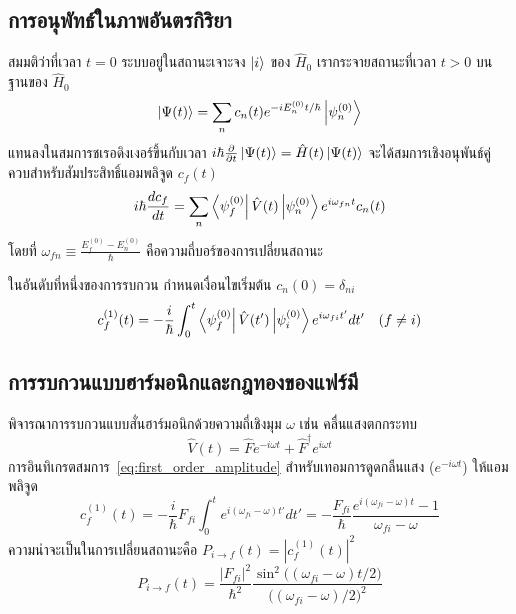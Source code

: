 \subsection{การอนุพัทธ์ในภาพอันตรกิริยา}
สมมติว่าที่เวลา $t = 0$ ระบบอยู่ในสถานะเจาะจง $\ket{i}$ ของ $\hat{H}_0$ เรากระจายสถานะที่เวลา $t > 0$ บนฐานของ $\hat{H}_0$
\begin{equation}
\ket{\Psi(t)} = \sum_n c_n(t) e^{-i E_n^{(0)} t/\hbar} \ket{\psi_n^{(0)}}
\end{equation}
แทนลงในสมการชเรอดิงเงอร์ขึ้นกับเวลา $i\hbar \frac{\partial}{\partial t}\ket{\Psi(t)} = \hat{H}(t)\ket{\Psi(t)}$ จะได้สมการเชิงอนุพันธ์คู่ควบสำหรับสัมประสิทธิ์แอมพลิจูด $c_f(t)$
\begin{equation}
i\hbar \frac{dc_f}{dt} = \sum_n \bra{\psi_f^{(0)}} \hat{V}(t) \ket{\psi_n^{(0)}} e^{i\omega_{fn} t} c_n(t)
\end{equation}
โดยที่ $\omega_{fn} \equiv \frac{E_f^{(0)} - E_n^{(0)}}{\hbar}$ คือความถี่บอร์ของการเปลี่ยนสถานะ

ในอันดับที่หนึ่งของการรบกวน กำหนดเงื่อนไขเริ่มต้น $c_n(0) = \delta_{ni}$
\begin{equation}
c_f^{(1)}(t) = -\frac{i}{\hbar} \int_0^t \bra{\psi_f^{(0)}} \hat{V}(t') \ket{\psi_i^{(0)}} e^{i\omega_{fi} t'} dt' \quad (f \neq i)
\label{eq:first_order_amplitude}
\end{equation}

\subsection{การรบกวนแบบฮาร์มอนิกและกฎทองของแฟร์มี}
พิจารณาการรบกวนแบบสั่นฮาร์มอนิกด้วยความถี่เชิงมุม $\omega$ เช่น คลื่นแสงตกกระทบ
\begin{equation}
\hat{V}(t) = \hat{F} e^{-i\omega t} + \hat{F}^\dagger e^{i\omega t}
\end{equation}
การอินทิเกรตสมการ~\eqref{eq:first_order_amplitude} สำหรับเทอมการดูดกลืนแสง ($e^{-i\omega t}$) ให้แอมพลิจูด
\begin{equation}
c_f^{(1)}(t) = -\frac{i}{\hbar} F_{fi} \int_0^t e^{i(\omega_{fi} - \omega)t'} dt' = -\frac{F_{fi}}{\hbar} \frac{e^{i(\omega_{fi} - \omega)t} - 1}{\omega_{fi} - \omega}
\end{equation}
ความน่าจะเป็นในการเปลี่ยนสถานะคือ $P_{i \to f}(t) = |c_f^{(1)}(t)|^2$
\begin{equation}
P_{i \to f}(t) = \frac{|F_{fi}|^2}{\hbar^2} \frac{\sin^2\big( (\omega_{fi} - \omega)t/2 \big)}{\big( (\omega_{fi} - \omega)/2 \big)^2}
\end{equation}

